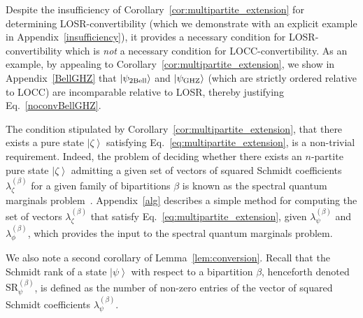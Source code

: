 \documentclass[prx,11pt,letterpaper,twocolumn,accepted=2023-11-27]{quantumarticle}
\newcommand{\ket}[1]{\left| #1 \right>}
\theoremstyle{plain}
\theoremstyle{definition}
\begin{document}
Despite the insufficiency of Corollary~\ref{cor:multipartite_extension} for determining LOSR-convertibility (which we demonstrate with an explicit example in Appendix~\ref{insufficiency}), it provides a necessary condition for LOSR-convertibility which
 is {\em not} a necessary condition for LOCC-convertibility.
  As an example, by appealing to Corollary~\ref{cor:multipartite_extension}, we show in Appendix~\ref{BellGHZ} that $\ket{\psi_{\rm 2Bell}}$ and $\ket{\psi_{\rm GHZ}}$ (which are strictly ordered relative to LOCC) are incomparable relative to LOSR, thereby justifying Eq.~\eqref{noconvBellGHZ}. 

The condition stipulated by Corollary~\ref{cor:multipartite_extension}, that there exists a pure state $\ket{\zeta}$ satisfying Eq.~\eqref{eq:multipartite_extension},
is a non-trivial requirement. Indeed, the problem of deciding whether there exists an $n$-partite pure state $\ket{\zeta}$ admitting a given set of vectors of squared Schmidt coefficients $\lambda^{(\beta)}_{\zeta}$ for a given
 family of bipartitions $\beta$ is known as the spectral quantum marginals problem~\cite{klyachko2006quantum,walter2013entanglement}.
Appendix~\ref{alg} describes a simple method for computing  the set of vectors $\lambda_{\zeta}^{(\beta)}$ that satisfy Eq.~\eqref{eq:multipartite_extension}, given $\lambda_{\psi}^{(\beta)}$ and $\lambda_{\phi}^{(\beta)}$, which provides the input to the spectral quantum marginals problem.

We also note a second corollary of Lemma~\ref{lem:conversion}.
 Recall that the Schmidt rank of a state $\ket{\psi}$ with respect to a bipartition $\beta$, henceforth denoted $\mathrm{SR}_{\psi}^{(\beta)}$, is defined as the 
number of non-zero entries of the vector of squared Schmidt coefficients $\lambda_{\psi}^{(\beta)}$.
\end{document}
